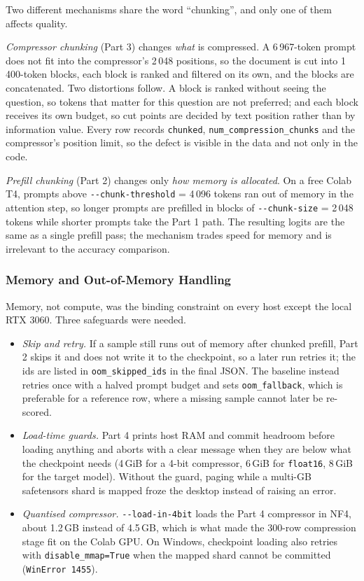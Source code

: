﻿\documentclass[10pt,a4paper,twocolumn]{article}
\begin{document}
Two different mechanisms share the word ``chunking'', and only one of them affects
quality.

\emph{Compressor chunking} (Part 3) changes \emph{what} is compressed. A
6\,967-token prompt does not fit into the compressor's 2\,048 positions, so the
document is cut into 1\,400-token blocks, each block is ranked and filtered on its
own, and the blocks are concatenated. Two distortions follow. A block is ranked
without seeing the question, so tokens that matter for this question are not
preferred; and each block receives its own budget, so cut points are decided by
text position rather than by information value. Every row records
\texttt{chunked}, \texttt{num\_compression\_chunks} and the compressor's position
limit, so the defect is visible in the data and not only in the code.

\emph{Prefill chunking} (Part 2) changes only \emph{how memory is allocated}. On a
free Colab T4, prompts above \texttt{-{}-chunk-threshold} = 4\,096 tokens ran out
of memory in the attention step, so longer prompts are prefilled in blocks of
\texttt{-{}-chunk-size} = 2\,048 tokens while shorter prompts take the Part 1
path. The resulting logits are the same as a single prefill pass; the mechanism
trades speed for memory and is irrelevant to the accuracy comparison.

\subsubsection{Memory and Out-of-Memory Handling}
\label{sec:oom}

Memory, not compute, was the binding constraint on every host except the local RTX
3060. Three safeguards were needed.

\begin{itemize}
  \item \emph{Skip and retry.} If a sample still runs out of memory after chunked
  prefill, Part 2 skips it and does not write it to the checkpoint, so a later run
  retries it; the ids are listed in \texttt{oom\_skipped\_ids} in the final JSON.
  The baseline instead retries once with a halved prompt budget and sets
  \texttt{oom\_fallback}, which is preferable for a reference row, where a missing
  sample cannot later be re-scored.
  \item \emph{Load-time guards.} Part 4 prints host RAM and commit headroom before
  loading anything and aborts with a clear message when they are below what the
  checkpoint needs (4\,GiB for a 4-bit compressor, 6\,GiB for \texttt{float16},
  8\,GiB for the target model). Without the guard, paging while a multi-GB
  safetensors shard is mapped froze the desktop instead of raising an error.
  \item \emph{Quantised compressor.} \texttt{-{}-load-in-4bit} loads the Part 4
  compressor in NF4, about 1.2\,GB instead of 4.5\,GB, which is what made the
  300-row compression stage fit on the Colab GPU. On Windows, checkpoint loading
  also retries with \texttt{disable\_mmap=True} when the mapped shard cannot be
  committed (\texttt{WinError 1455}).
\end{itemize}
\end{document}

